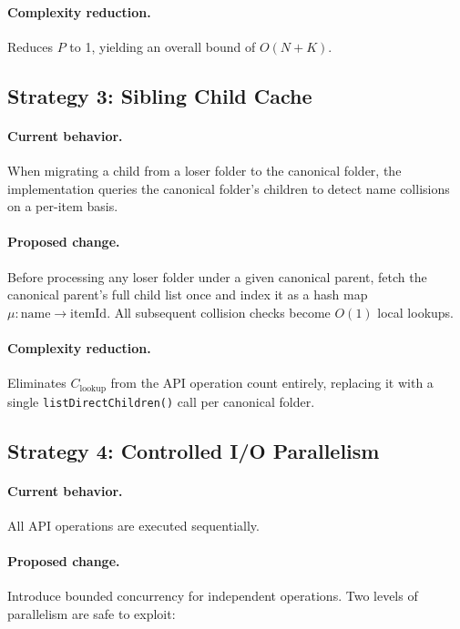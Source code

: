 \documentclass[12pt,a4paper]{article}
\begin{document}
\paragraph{Complexity reduction.} Reduces $P$ to 1, yielding an overall bound of $O(N + K)$.

\subsection{Strategy 3: Sibling Child Cache}

\paragraph{Current behavior.} When migrating a child from a loser folder to the canonical folder, the implementation queries the canonical folder's children to detect name collisions on a per-item basis.

\paragraph{Proposed change.} Before processing any loser folder under a given canonical parent, fetch the canonical parent's full child list once and index it as a hash map $\mu: \text{name} \to \text{itemId}$. All subsequent collision checks become $O(1)$ local lookups.

\paragraph{Complexity reduction.} Eliminates $C_{\text{lookup}}$ from the API operation count entirely, replacing it with a single \texttt{listDirectChildren()} call per canonical folder.

\subsection{Strategy 4: Controlled I/O Parallelism}

\paragraph{Current behavior.} All API operations are executed sequentially.

\paragraph{Proposed change.} Introduce bounded concurrency for independent operations. Two levels of parallelism are safe to exploit:
\end{document}
